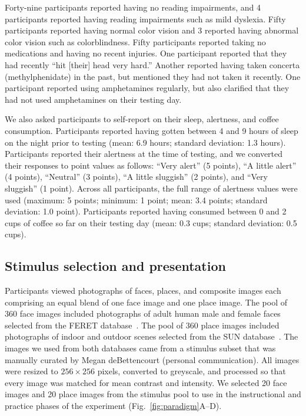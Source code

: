 \documentclass[english]{article}
\begin{document}
Forty-nine participants reported having no reading impairments, and 4
participants reported having reading impairments such as mild dyslexia. Fifty
participants reported having normal color vision and 3 reported having abnormal
color vision such as colorblindness. Fifty participants reported taking no
medications and having no recent injuries. One participant reported that they
had recently ``hit [their] head very hard.'' Another reported having taken
concerta (methylphenidate) in the past, but mentioned they had not taken it
recently. One participant reported using amphetamines regularly, but also
clarified that they had not used amphetamines on their testing day.

We also asked participants to self-report on their sleep, alertness, and coffee
consumption. Participants reported having gotten between 4 and 9 hours of sleep
on the night prior to testing (mean: 6.9 hours; standard deviation: 1.3 hours).
Participants reported their alertness at the time of testing, and we converted
their responses to point values as follows: ``Very alert'' (5 points), ``A
little alert'' (4 points), ``Neutral'' (3 points), ``A little sluggish'' (2
points), and ``Very sluggish'' (1 point). Across all participants, the full
range of alertness values were used (maximum: 5 points; minimum: 1 point; mean:
3.4 points; standard deviation: 1.0 point). Participants reported having
consumed between 0 and 2 cups of coffee so far on their testing day (mean: 0.3
cups; standard deviation: 0.5 cups).

\subsection*{Stimulus selection and presentation} 

Participants viewed photographs of faces, places, and composite images each
comprising an equal blend of one face image and one place image. The pool of
360 face images included photographs of adult human male and female faces
selected from the FERET database~\citep{PhilEtal98}. The pool of 360 place
images included photographs of indoor and outdoor scenes selected from the SUN
database~\citep{XiaoEtal10}. The images we used from both databases came from a
stimulus subset that was manually curated by Megan deBettencourt (personal
communication). All images were resized to $256 \times 256$ pixels, converted
to greyscale, and processed so that every image was matched for mean contrast
and intensity. We selected 20 face images and 20 place images from the stimulus
pool to use in the instructional and practice phases of the experiment
(Fig.~\ref{fig:paradigm}A--D).
\end{document}
